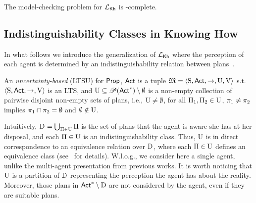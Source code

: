 \begin{proposition}[\cite{DF23}]
    The model-checking problem for ${\mathcal{L}_{{\mathsf{Kh}}}}$ is \PSPACE-complete.
\end{proposition}

\subsection{Indistinguishability Classes in Knowing How}

In what follows we introduce the generalization of ${\mathcal{L}_{{\mathsf{Kh}}}}$ where the perception of each agent is determined by an indistinguishability relation between plans~\cite{AFSVQ21,AFSVQ23}. 

\begin{definition}\label{def:ults}
    An \emph{uncertainty-based \lts} (LTSU) for ${\rm \sf Prop}$, ${\rm \sf Act}$ is a tuple     ${\mathfrak{M}}=\langle{\operatorname{S},{\rm \sf Act},\rightarrow,\operatorname{U},\operatorname{V}}\rangle$ s.t. $\langle{\operatorname{S},{\rm \sf Act},\rightarrow,\operatorname{V}}\rangle$ is an LTS, and 
    $\operatorname{U}\subseteq \mathscr{P}({\rm \sf Act}^*)\setminus \emptyset$ is a non-empty collection of pairwise disjoint non-empty sets of plans, i.e., $\operatorname{U}\neq\emptyset$, for all $\Pi_1,\Pi_2\in\operatorname{U}$, $\pi_1\neq\pi_2$ implies  $\pi_1\cap\pi_2=\emptyset$ and $\emptyset\notin\operatorname{U}$. 

    \end{definition}
    
Intuitively, $\operatorname{D}_{} = \bigcup_{\Pi \in \operatorname{U}} \Pi$ is the set of plans that the  agent is aware she has at her disposal, and each $\Pi \in \operatorname{U}$ is an indistinguishability class. Thus, $\operatorname{U}$ is in direct correspondence to an equivalence relation over $\operatorname{D}_{}$, where each $\Pi\in\operatorname{U}$ defines an equivalence class (see~\cite{AFSVQ21,AFSVQ23} for details). W.l.o.g., we consider here a single agent, unlike the multi-agent presentation from previous works.
%
It is worth noticing that  $\operatorname{U}$ is a partition of $\operatorname{D}_{}$ representing the perception the agent has about the reality.  Moreover, those plans in ${\rm \sf Act}^*\setminus\operatorname{D}_{}$ are not considered by the agent, even if they are suitable plans. 


